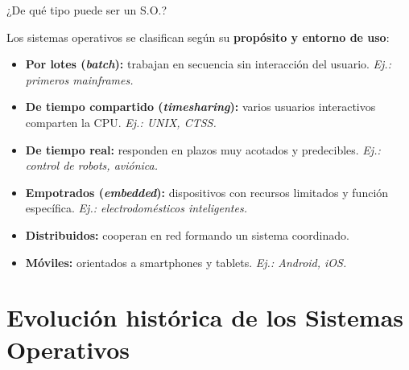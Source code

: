 \documentclass[xcolor=svgnames]{beamer}
\begin{document}
\begin{frame}{¿De qué tipo puede ser un S.O.?}

  Los sistemas operativos se clasifican según su \textbf{propósito y entorno de uso}:

  \vspace{0.2cm}

  \begin{itemize}
    \item[\textcolor{mqred}{\ding{228}}] \textbf{Por lotes (\textit{batch}):} trabajan en secuencia sin interacción del usuario. \textit{Ej.: primeros mainframes.}
    \item[\textcolor{mqred}{\ding{228}}] \textbf{De tiempo compartido (\textit{timesharing}):} varios usuarios interactivos comparten la CPU. \textit{Ej.: UNIX, CTSS.}
    \item[\textcolor{mqred}{\ding{228}}] \textbf{De tiempo real:} responden en plazos muy acotados y predecibles. \textit{Ej.: control de robots, aviónica.}
    \item[\textcolor{mqred}{\ding{228}}] \textbf{Empotrados (\textit{embedded}):} dispositivos con recursos limitados y función específica. \textit{Ej.: electrodomésticos inteligentes.}
    \item[\textcolor{mqred}{\ding{228}}] \textbf{Distribuidos:} cooperan en red formando un sistema coordinado.
    \item[\textcolor{mqred}{\ding{228}}] \textbf{Móviles:} orientados a smartphones y tablets. \textit{Ej.: Android, iOS.}
  \end{itemize}

\end{frame}

\section{Evolución histórica de los Sistemas Operativos}
\end{document}
